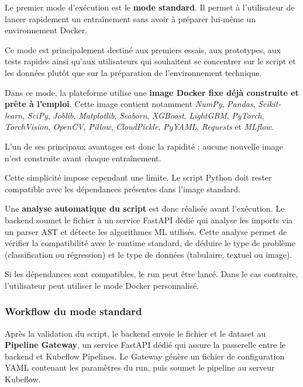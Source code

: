 Le premier mode d'exécution est le \textbf{mode standard}. Il permet à
l'utilisateur de lancer rapidement un entraînement sans avoir à préparer
lui-même un environnement Docker.

Ce mode est principalement destiné aux premiers essais, aux prototypes,
aux tests rapides ainsi qu'aux utilisateurs qui souhaitent se concentrer
sur le script et les données plutôt que sur la préparation de
l'environnement technique.

Dans ce mode, la plateforme utilise une \textbf{image Docker fixe déjà
construite et prête à l'emploi}. Cette image contient notamment
\textit{NumPy}, \textit{Pandas}, \textit{Scikit-learn},
\textit{SciPy}, \textit{Joblib}, \textit{Matplotlib},
\textit{Seaborn}, \textit{XGBoost}, \textit{LightGBM},
\textit{PyTorch}, \textit{TorchVision}, \textit{OpenCV},
\textit{Pillow}, \textit{CloudPickle}, \textit{PyYAML},
\textit{Requests} et \textit{MLflow}.

L'un de ses principaux avantages est donc la rapidité : aucune nouvelle
image n'est construite avant chaque entraînement.

Cette simplicité impose cependant une limite. Le script Python doit
rester compatible avec les dépendances présentes dans l'image standard.

Une \textbf{analyse automatique du script} est donc réalisée avant
l'exécution. Le backend soumet le fichier à un service FastAPI dédié
qui analyse les imports via un parser AST et détecte les algorithmes
ML utilisés. Cette analyse permet de vérifier la compatibilité avec
le runtime standard, de déduire le type de problème
(classification ou régression) et le type de données
(tabulaire, textuel ou image).

Si les dépendances sont compatibles, le run peut être lancé. Dans le
cas contraire, l'utilisateur peut utiliser le mode Docker personnalisé.


\subsubsection{Workflow du mode standard}
\label{subsubsec:sprint2-standard-workflow}

Après la validation du script, le backend envoie le fichier et le
dataset au \textbf{Pipeline Gateway}, un service FastAPI dédié qui
assure la passerelle entre le backend et Kubeflow Pipelines. Le
Gateway génère un fichier de configuration YAML contenant les
paramètres du run, puis soumet le pipeline au serveur Kubeflow.

